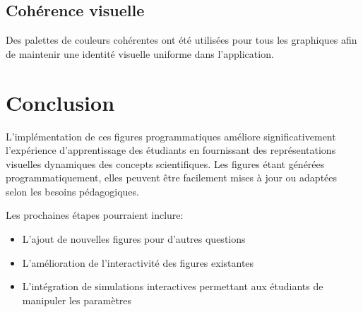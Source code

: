 \documentclass{article}
\begin{document}
\subsection{Cohérence visuelle}

Des palettes de couleurs cohérentes ont été utilisées pour tous les graphiques afin de maintenir une identité visuelle uniforme dans l'application.

\section{Conclusion}

L'implémentation de ces figures programmatiques améliore significativement l'expérience d'apprentissage des étudiants en fournissant des représentations visuelles dynamiques des concepts scientifiques. Les figures étant générées programmatiquement, elles peuvent être facilement mises à jour ou adaptées selon les besoins pédagogiques.

Les prochaines étapes pourraient inclure:
\begin{itemize}
    \item L'ajout de nouvelles figures pour d'autres questions
    \item L'amélioration de l'interactivité des figures existantes
    \item L'intégration de simulations interactives permettant aux étudiants de manipuler les paramètres
\end{itemize}
\end{document}
